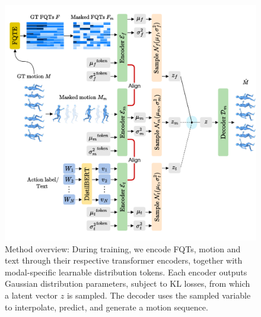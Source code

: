 \begin{figure}
	\centering
	\includegraphics[width=1\textwidth]{figures/chapter3/fig_model}
	\caption{Method overview: During training, we encode FQTs, motion and text through their respective transformer encoders, together with modal-specific learnable distribution tokens. Each encoder outputs Gaussian distribution parameters, subject to KL losses, from which a latent vector $z$ is sampled. The decoder uses the sampled variable to interpolate, predict, and generate a motion sequence.}
	\label{fig_model}
\end{figure}

